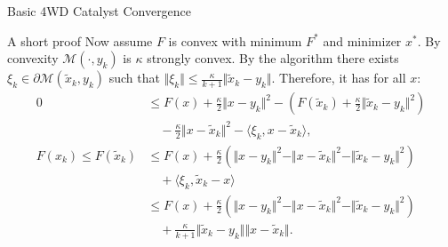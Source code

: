 \documentclass[11pt]{beamer}
\begin{document}
\begin{frame}{Basic 4WD Catalyst Convergence}
\begin{block}{\tiny A short proof}
                {
                Now assume $F$ is convex with minimum $F^*$ and minimizer $x^*$. 
                By convexity $\mathcal M(\cdot, y_{k})$ is $\kappa$ strongly convex. 
                By the algorithm there exists $\xi_k \in \partial \mathcal M(\tilde x_k, y_k)$ such that $\Vert \xi_k\Vert \le \frac{\kappa}{k + 1}\Vert \tilde x_k - y_k\Vert$. 
                Therefore, it has for all $x$: 
                \begin{align*}
                    0 &\le
                    F(x) + \frac{\kappa}{2}\Vert x - y_k\Vert^2 
                    - \left(
                        F(\tilde x_k) 
                        + \frac{\kappa}{2}\Vert \tilde x_k - y_k\Vert^2
                    \right)
                    \\
                    & \quad 
                        - \frac{\kappa}{2}\Vert x - \tilde x_k\Vert^2 
                        - \langle \xi_k, x - \tilde x_k\rangle, 
                    \\
                    F(x_k)
                    \le F(\tilde x_k) 
                    &\le 
                    F(x) + \frac{\kappa}{2}\left(
                        \Vert x - y_k\Vert^2 - \Vert x - \tilde x_k\Vert^2 - \Vert \tilde x_k - y_k\Vert^2
                    \right)
                    \\ &\quad 
                        + \langle  \xi_k, \tilde x_k - x \rangle 
                    \\
                    &\le 
                    F(x) + \frac{\kappa}{2}\left(
                        \Vert x - y_k\Vert^2 - \Vert x - \tilde x_k\Vert^2 - \Vert \tilde x_k - y_k\Vert^2
                    \right)
                    \\ &\quad 
                        + \frac{\kappa}{k + 1}\Vert \tilde x_k - y_k\Vert\Vert x - \tilde x_k\Vert. 
                \end{align*}
                }
                

\end{block}
\end{frame}
\end{document}
